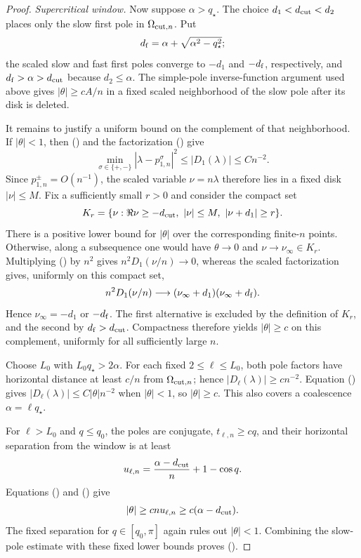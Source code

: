 \documentclass[twoside,10pt]{article}
\numberwithin{equation}{section}
\theoremstyle{slbody}
\theoremstyle{definition}
\theoremstyle{remark}
\renewcommand{\eqref}[1]{%
  \textup{{\normalfont(\oldstylenums{\ref{#1}}}\normalfont)}}
\begin{document}
\begin{proof}
\smallskip
\noindent\emph{Supercritical window.}
Now suppose $\alpha>q_\star$.  The choice
$d_1<d_{\rm cut}<d_2$ places only the slow first pole in
$\Omega_{{\rm cut},n}$.  Put
\[
 d_{\rm f}=\alpha+\sqrt{\alpha^2-q_\star^2};
\]
the scaled slow and fast first poles converge to $-d_1$ and
$-d_{\rm f}$, respectively, and
$d_{\rm f}>\alpha>d_{\rm cut}$ because $d_2\le\alpha$.  The
simple-pole inverse-function
argument used above gives $|\theta|\ge cA/n$ in a fixed scaled
neighborhood of the slow pole after its disk is deleted.

It remains to justify a uniform bound on the complement of that
neighborhood.  If $|\theta|<1$, then
\eqref{eq:critical-cosh-local-bound} and the factorization
\eqref{eq:critical-w-pole-factorization} give
\[
 \min_{\sigma\in\{+,-\}}
 |\lambda-p_{1,n}^{\sigma}|^2
 \le |D_1(\lambda)|\le Cn^{-2}.
\]
Since $p_{1,n}^{\pm}=O(n^{-1})$, the scaled variable
$\nu=n\lambda$ therefore lies in a fixed disk $|\nu|\le M$.  Fix a
sufficiently small $r>0$ and consider the compact set
\[
 K_r=\{\nu:\Re\nu\ge-d_{\rm cut},\ |\nu|\le M,
                    \ |\nu+d_1|\ge r\}.
\]
There is a positive lower bound for $|\theta|$ over the corresponding
finite-$n$ points.  Otherwise, along a subsequence one would have
$\theta\to0$ and $\nu\to\nu_\infty\in K_r$.  Multiplying
\eqref{eq:critical-cosh-local-bound} by $n^2$ gives
$n^2D_1(\nu/n)\to0$, whereas the scaled factorization gives, uniformly
on this compact set,
\[
 n^2D_1(\nu/n)\longrightarrow
   (\nu_\infty+d_1)(\nu_\infty+d_{\rm f}).
\]
Hence $\nu_\infty=-d_1$ or $-d_{\rm f}$.  The first alternative is
excluded by the definition of $K_r$, and the second by
$d_{\rm f}>d_{\rm cut}$.  Compactness therefore yields
$|\theta|\ge c$ on this complement, uniformly for all sufficiently
large $n$.

Choose $L_0$ with $L_0q_\star>2\alpha$.  For each fixed
$2\le\ell\le L_0$, both pole factors have horizontal distance at
least $c/n$ from $\Omega_{{\rm cut},n}$; hence
$|D_\ell(\lambda)|\ge cn^{-2}$.  Equation
\eqref{eq:critical-cosh-local-bound} gives
$|D_\ell(\lambda)|\le C|\theta|n^{-2}$ when $|\theta|<1$, so
$|\theta|\ge c$.  This also covers a coalescence
$\alpha=\ell q_\star$.

For $\ell>L_0$ and $q\le q_0$, the poles are conjugate,
$t_{\ell,n}\ge cq$, and their horizontal separation from the window
is at least
\[
 u_{\ell,n}=\frac{\alpha-d_{\rm cut}}{n}+1-\cos q.
\]
Equations \eqref{eq:critical-conjugate-product-bound} and
\eqref{eq:critical-cosh-local-bound} give
\[
 |\theta|\ge c n u_{\ell,n}\ge c(\alpha-d_{\rm cut}).
\]
The fixed separation for $q\in[q_0,\pi]$ again rules out
$|\theta|<1$.  Combining the slow-pole estimate with these fixed
lower bounds proves
\eqref{eq:critical-pole-distance-supercritical}.
\end{proof}
\end{document}
